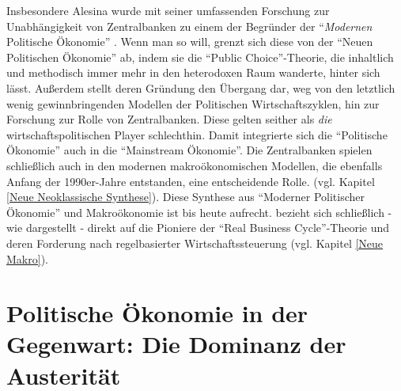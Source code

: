 Insbesondere Alesina wurde mit seiner umfassenden Forschung zur Unabhängigkeit von Zentralbanken zu einem der Begründer der "`\textit{Modernen} Politische Ökonomie"' \parencite{Mineo2020}. Wenn man so will, grenzt sich diese von der "`Neuen Politischen Ökonomie"' ab, indem sie die "`Public Choice"'-Theorie, die inhaltlich und methodisch immer mehr in den heterodoxen Raum wanderte, hinter sich lässt. Außerdem stellt deren Gründung den Übergang dar, weg von den letztlich wenig gewinnbringenden Modellen der Politischen Wirtschaftszyklen, hin zur Forschung zur Rolle von Zentralbanken. Diese gelten seither als \textit{die} wirtschaftspolitischen Player schlechthin. Damit integrierte sich die "`Politische Ökonomie"' auch in die "`Mainstream Ökonomie"'. Die Zentralbanken spielen schließlich auch in den modernen makroökonomischen Modellen, die ebenfalls Anfang der 1990er-Jahre entstanden, eine entscheidende Rolle. (vgl. Kapitel \ref{Neue Neoklassische Synthese}). Diese Synthese aus "`Moderner Politischer Ökonomie"' und Makroökonomie ist bis heute aufrecht. \textcite[S. 653]{Alesina1987} bezieht sich schließlich - wie dargestellt - direkt auf die Pioniere der "`Real Business Cycle"'-Theorie \textcite{Kydland1977} und deren Forderung nach regelbasierter Wirtschaftssteuerung (vgl. Kapitel \ref{Neue Makro}). 

\section{Politische Ökonomie in der Gegenwart: Die Dominanz der Austerität}
\label{PolEcon_Gegenwart}

